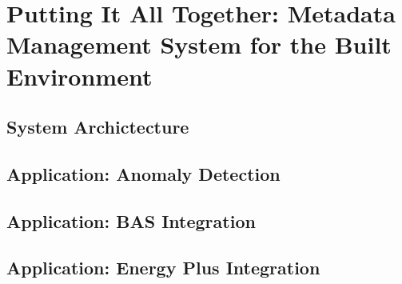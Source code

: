 
\chapter{Putting It All Together: Metadata Management System for the Built Environment}

\section{System Archictecture}

\section{Application: Anomaly Detection}

\section{Application: BAS Integration}

\section{Application: Energy Plus Integration}